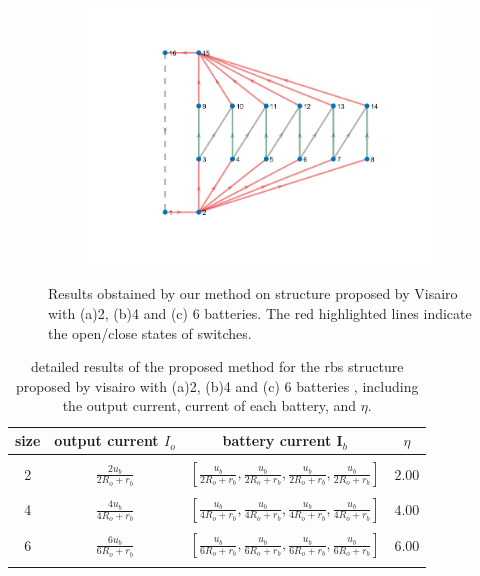 \documentclass{article}
\begin{document}
\begin{figure}[htbp]
\begin{subfigure}[b]{0.3\textwidth}
    \caption{}
    \label{fig:d-size-4}
  \end{subfigure}
  \hspace{0.05\textwidth}
  \begin{subfigure}[b]{0.45\textwidth}
    \includegraphics[width=\textwidth]{../attachments/f-dege-mac-6.png}
    \caption{}
    \label{fig:d-size-6}
  \end{subfigure}
    
  \caption{Results obstained by our method on structure proposed by Visairo\cite{visairoReconfigurableBatteryPack2008} with (a)2, (b)4 and (c) 6 batteries.  The red highlighted lines indicate the open/close states of switches.}
  \label{fig:d-size}
\end{figure}

\begin{table}[h]
    \caption{detailed results of the proposed method for the rbs structure  proposed by visairo\cite{visairoReconfigurableBatteryPack2008} with (a)2, (b)4 and (c) 6 batteries , including the output current, current of each battery, and $\eta$.}
    \label{tab:d-size}
    \begin{tabular}{cccc}
        \hline
        size &  output current $I_o$       & battery current $\bm{I}_b$       & $\eta$        \\ 
        \hline\\
        2 &  $\displaystyle\frac{2u_b}{2R_o + r_b}$ &  $\displaystyle\left[\frac{u_b}{2R_o + r_b},\frac{u_b}{2R_o + r_b},\frac{u_b}{2R_o + r_b},\frac{u_b}{2R_o + r_b}\right]$   & $2.00$ \\ 
        \\
        4 &  $\displaystyle\frac{4u_b}{4R_o + r_b}$ &  $\displaystyle\left[\frac{u_b}{4R_o + r_b},\frac{u_b}{4R_o + r_b},\frac{u_b}{4R_o + r_b},\frac{u_b}{4R_o + r_b}\right]$   & $4.00$ \\ 
        \\
        6 &  $\displaystyle\frac{6u_b}{6R_o + r_b}$ &  $\displaystyle\left[\frac{u_b}{6R_o + r_b},\frac{u_b}{6R_o + r_b},\frac{u_b}{6R_o + r_b},\frac{u_b}{6R_o + r_b}\right]$   & $6.00$ \\ 
        \\
        \hline
    \end{tabular}
\end{table}
\end{document}
